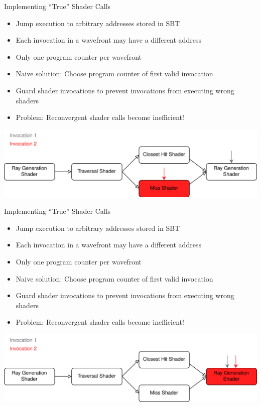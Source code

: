\documentclass[aspectratio=169,t]{beamer}
\begin{document}
\begin{slide}{Implementing ``True'' Shader Calls}
 \begin{itemize}
  \item Jump execution to arbitrary addresses stored in SBT
  \item Each invocation in a wavefront may have a different address
  \item Only one program counter per wavefront
  \item Naive solution: Choose program counter of first valid invocation
  \item Guard shader invocations to prevent invocations from executing wrong shaders
  \item Problem: Reconvergent shader calls become inefficient!
 \end{itemize}
 \includegraphics[width=\textwidth]{graphics/RTStages2-5.png}
\end{slide}

\begin{slide}{Implementing ``True'' Shader Calls}
 \begin{itemize}
  \item Jump execution to arbitrary addresses stored in SBT
  \item Each invocation in a wavefront may have a different address
  \item Only one program counter per wavefront
  \item Naive solution: Choose program counter of first valid invocation
  \item Guard shader invocations to prevent invocations from executing wrong shaders
  \item Problem: Reconvergent shader calls become inefficient!
 \end{itemize}
 \includegraphics[width=\textwidth]{graphics/RTStages2-6.png}
\end{slide}
\end{document}
